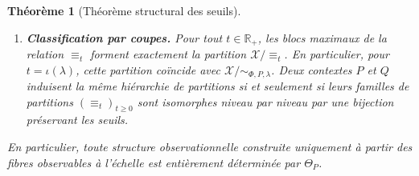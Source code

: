 \documentclass[11pt,a4paper]{article}
\newtheorem{theorem}{Théorème}
\begin{document}
\begin{theorem}[Théorème structural des seuils]
\begin{enumerate}[label=\textbf{(\Alph*)}]
\item \textbf{Classification par coupes.} Pour tout \(t\in\mathbb R_+\), les blocs maximaux de la relation \(\equiv_t\) forment exactement la partition \(\mathcal X/{\equiv_t}\). En particulier, pour \(t=\iota(\lambda)\), cette partition coïncide avec \(\mathcal X/{\sim_{\Phi,P,\lambda}}\). Deux contextes \(P\) et \(Q\) induisent la même hiérarchie de partitions si et seulement si leurs familles de partitions \((\equiv_t)_{t\ge 0}\) sont isomorphes niveau par niveau par une bijection préservant les seuils.
\end{enumerate}

En particulier, toute structure observationnelle construite uniquement à partir des fibres observables à l'échelle est entièrement déterminée par \(\Theta_P\).
\end{theorem}
\end{document}
